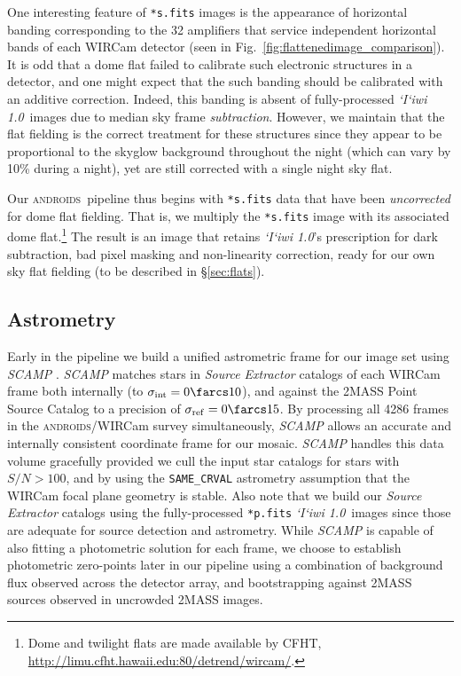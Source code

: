 \documentclass[iop]{emulateapj}
\newcommand{\sw}[1]{\textit{#1}} %
\newcommand{\iiwione}{\sw{`I`iwi 1.0}}
\newcommand{\androids}{\textsc{androids}}
\newcommand{\Fig}[1]{Fig.~\ref{fig:#1}}  %
\newcommand{\Sec}[1]{\S\ref{sec:#1}}  %
\begin{document}
One interesting feature of \texttt{*s.fits} images is the appearance of horizontal banding corresponding to the 32 amplifiers that service independent horizontal bands of each WIRCam detector (seen in \Fig{flattenedimage_comparison}).
It is odd that a dome flat failed to calibrate such electronic structures in a detector, and one might expect that the such banding should be calibrated with an additive correction.
Indeed, this banding is absent of fully-processed \iiwione\ images due to median sky frame \textit{subtraction}.
However, we maintain that the flat fielding is the correct treatment for these structures since they appear to be proportional to the skyglow background throughout the night (which can vary by 10\% during a night), yet are still corrected with a single night sky flat.

Our \androids\ pipeline thus begins with \texttt{*s.fits} data that have been \textit{uncorrected} for dome flat fielding.
That is, we multiply the \texttt{*s.fits} image with its associated dome flat.\footnote{Dome and twilight flats are made available by CFHT, \url{http://limu.cfht.hawaii.edu:80/detrend/wircam/}.}
The result is an image that retains \iiwione's prescription for dark subtraction, bad pixel masking and non-linearity correction, ready for our own sky flat fielding (to be described in \Sec{flats}).

\subsection{Astrometry}

Early in the pipeline we build a unified astrometric frame for our image set using \sw{SCAMP} \citep{Bertin:2006}.
\sw{SCAMP} matches stars in \sw{Source Extractor} \citep{Bertin:1996} catalogs of each WIRCam frame both internally (to $\sigma_\mathrm{int}=0\farcs 10$), and against the 2MASS Point Source Catalog \citep{Skrutskie:2006} to a precision of $\sigma_\mathrm{ref}=0 \farcs 15$.
By processing all 4286 frames in the \androids /WIRCam survey simultaneously, \sw{SCAMP} allows an accurate and internally consistent coordinate frame for our mosaic.
\sw{SCAMP} handles this data volume gracefully provided we cull the input star catalogs for stars with $S/N > 100$, and by using the \texttt{SAME\_CRVAL} astrometry assumption that the WIRCam focal plane geometry is stable.
Also note that we build our \sw{Source Extractor} catalogs using the fully-processed \texttt{*p.fits} \iiwione\ images since those are adequate for source detection and astrometry.
While \sw{SCAMP} is capable of also fitting a photometric solution for each frame, we choose to establish photometric zero-points later in our pipeline using a combination of background flux observed across the detector array, and bootstrapping against 2MASS sources observed in uncrowded 2MASS images.
\end{document}
